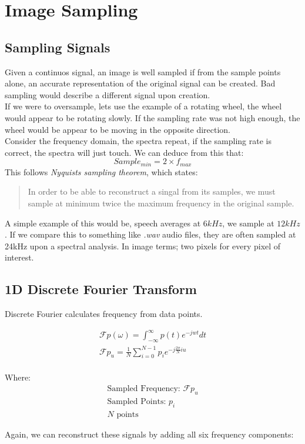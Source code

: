 \section{Image Sampling}

\subsection{Sampling Signals}
Given a continuos signal, an image is well sampled if from the sample points alone, an accurate representation of the original signal can be created. Bad sampling would describe a different signal upon creation.
\\
If we were to oversample, lets use the example of a rotating wheel, the wheel would appear to be rotating slowly. If the sampling rate was not high enough, the wheel would be appear to be moving in the opposite direction.
\\
Consider the frequency domain, the spectra repeat, if the sampling rate is correct, the spectra will just touch. We can deduce from this that:
\begin{equation}
    Sample_{min} = 2 \times f_{max}
\end{equation}
This follows \textit{Nyquists sampling theorem}, which states:
\begin{quote}
    In order to be able to reconstruct a singal from its samples, we must sample at minimum twice the maximum frequency in the original sample.
\end{quote}
A simple example of this would be, speech averages at $6kHz$, we sample at $12kHz$. If we compare this to something like \textit{.wav} audio files, they are often sampled at 24kHz upon a spectral analysis. In image terms; two pixels for every pixel of interest.

\subsection{1D Discrete Fourier Transform}
Discrete Fourier calculates frequency from data points.

\begin{align}
    \mathcal{F}p(\omega) = \int_{-\infty}^{\infty}p(t)e^{-jwt}dt \\
    \mathcal{F}p_{u} =\frac{1}{N}\sum_{i=0}^{N-1}p_{i}e^{-j\frac{2\pi}{N}iu} \\
\end{align}

Where:
\begin{align}
    \text{Sampled Frequency: } \mathcal{F}p_{u} \\
    \text{Sampled Points: } p_{i}\\
    N \text{ points}
\end{align}

Again, we can reconstruct these signals by adding all six frequency components:



